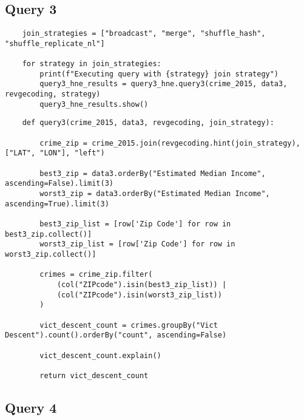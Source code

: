 \documentclass{article}
\begin{document}
\subsection*{Query 3}

\begin{lstlisting}
    join_strategies = ["broadcast", "merge", "shuffle_hash", "shuffle_replicate_nl"]

    for strategy in join_strategies:
        print(f"Executing query with {strategy} join strategy")
        query3_hne_results = query3_hne.query3(crime_2015, data3, revgecoding, strategy)
        query3_hne_results.show()
\end{lstlisting}

\begin{lstlisting}
    def query3(crime_2015, data3, revgecoding, join_strategy):

        crime_zip = crime_2015.join(revgecoding.hint(join_strategy), ["LAT", "LON"], "left")

        best3_zip = data3.orderBy("Estimated Median Income", ascending=False).limit(3)
        worst3_zip = data3.orderBy("Estimated Median Income", ascending=True).limit(3)

        best3_zip_list = [row['Zip Code'] for row in best3_zip.collect()]
        worst3_zip_list = [row['Zip Code'] for row in worst3_zip.collect()]

        crimes = crime_zip.filter(
            (col("ZIPcode").isin(best3_zip_list)) |
            (col("ZIPcode").isin(worst3_zip_list))
        )

        vict_descent_count = crimes.groupBy("Vict Descent").count().orderBy("count", ascending=False)

        vict_descent_count.explain()

        return vict_descent_count
\end{lstlisting}


\subsection*{Query 4}
\end{document}
